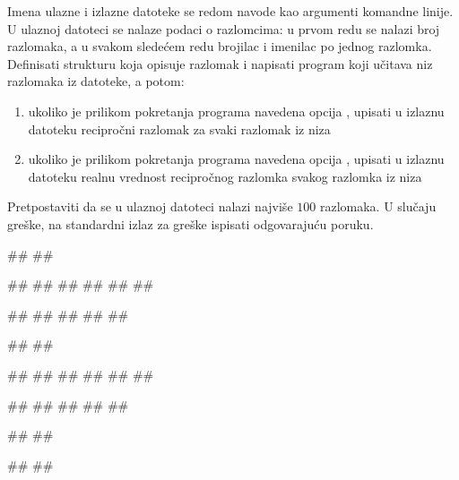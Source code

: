 \begin{Exercise}[label=v3_05] 
Imena ulazne i izlazne datoteke se redom navode kao argumenti komandne linije.  
U ulaznoj datoteci se nalaze podaci o razlomcima:
u prvom redu se nalazi broj razlomaka, a u svakom sledećem redu brojilac i imenilac po jednog razlomka. 
Definisati strukturu koja opisuje razlomak i napisati program koji učitava niz
razlomaka iz datoteke, a potom:
\begin{enumerate}
\setlength\itemsep{0em}
\item ukoliko je prilikom pokretanja programa navedena opcija , upisati u izlaznu datoteku recipročni 
razlomak za svaki razlomak iz niza
\item ukoliko je prilikom pokretanja programa navedena opcija , upisati u izlaznu datoteku 
realnu vrednost recipročnog razlomka svakog razlomka iz niza
\end{enumerate}
Pretpostaviti da se u ulaznoj datoteci nalazi najviše $100$ razlomaka.
U slučaju greške, na standardni izlaz za greške ispisati odgovarajuću poruku.

\begin{minitest}
\begin{upotreba}{1}
#\naslovPokretanje#
##

##
##
##
##
##
##

##
##
##
##
##
\end{upotreba}
\end{minitest}
\begin{minitest}
\begin{upotreba}{2}
#\naslovPokretanje#
##

##
##
##
##
##
##

##
##
##
##
##
\end{upotreba}
\end{minitest}
\begin{minitest}
\begin{upotreba}{3}
#\naslovPokretanje#
##

#\naslovIzlazZaGresku#
##
\end{upotreba}
\end{minitest}
\end{Exercise}
\begin{Answer}[ref=v3_05]
\end{Answer}


